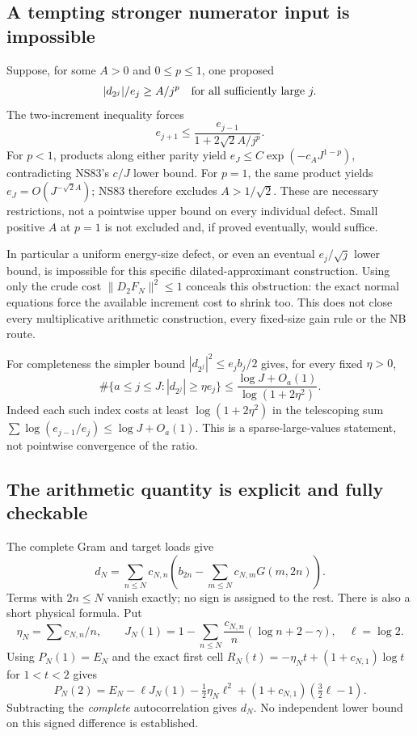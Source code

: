 \subsection{A tempting stronger numerator input is impossible}
Suppose, for some $A>0$ and $0\le p\le1$, one proposed
\begin{equation}
 |d_{2^j}|/e_j\ge A/j^p\quad\hbox{for all sufficiently large }j.
 \label{eq:ns88-proposed-numerator}
\end{equation}
The two-increment inequality forces
\[
 e_{j+1}\le\frac{e_{j-1}}{1+2\sqrt2 A/j^p}.
\]
For $p<1$, products along either parity yield
$e_J\le C\exp(-c_AJ^{1-p})$, contradicting NS83's $c/J$ lower bound.
For $p=1$, the same product yields $e_J=O(J^{-\sqrt2 A})$;
NS83 therefore excludes $A>1/\sqrt2$. These are necessary restrictions,
not a pointwise upper bound on every individual defect. Small positive
$A$ at $p=1$ is not excluded and, if proved eventually, would suffice.

In particular a uniform energy-size defect, or even an eventual
$e_j/\sqrt j$ lower bound, is impossible for this specific dilated-approximant
construction. Using only the crude cost $\|D_2F_N\|^2\le1$ conceals this
obstruction: the exact normal equations force the available increment
cost to shrink too. This does not close every multiplicative arithmetic
construction, every fixed-size gain rule or the NB route.

For completeness the simpler bound $|d_{2^j}|^2\le e_jb_j/2$ gives,
for every fixed $\eta>0$,
\[
 \#\{a\le j\le J: |d_{2^j}|\ge\eta e_j\}
 \le\frac{\log J+O_a(1)}{\log(1+2\eta^2)}.
\]
Indeed each such index costs at least $\log(1+2\eta^2)$ in the telescoping
sum $\sum\log(e_{j-1}/e_j)\le\log J+O_a(1)$.
This is a sparse-large-values statement, not pointwise convergence of the ratio.

\subsection{The arithmetic quantity is explicit and fully checkable}
The complete Gram and target loads give
\[
 d_N=\sum_{n\le N}c_{N,n}
       \left(b_{2n}-\sum_{m\le N}c_{N,m}G(m,2n)\right).
\]
Terms with $2n\le N$ vanish exactly; no sign is assigned to the rest.
There is also a short physical formula. Put
\[
 \eta_N=\sum c_{N,n}/n,\qquad
 J_N(1)=1-\sum_{n\le N}\frac{c_{N,n}}n(\log n+2-\gamma),\quad \ell=\log2.
\]
Using $P_N(1)=E_N$ and the exact first cell
$R_N(t)=-\eta_Nt+(1+c_{N,1})\log t$ for $1<t<2$ gives
\begin{equation}
 P_N(2)=E_N-\ell J_N(1)-\tfrac12\eta_N\ell^2
                +(1+c_{N,1})(\tfrac32\ell-1).
 \label{eq:ns88-potential-two}
\end{equation}
Subtracting the \emph{complete} autocorrelation gives $d_N$.
No independent lower bound on this signed difference is established.

